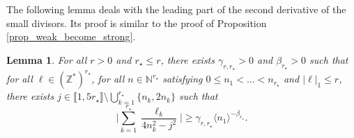 \documentclass[JEP,XML,SOM,Unicode,NoEqCountersInSection,published]{cedram}
\newtheorem{lemma}[theorem]{Lemma}
\theoremstyle{definition}
\begin{document}
The following lemma deals with the leading part of the second derivative of the small divisors. Its proof is similar to the proof of Proposition \ref{prop_weak_become_strong}.
\begin{lemma}\label{lem_SD_frac}
For all $r>0$ and $r_\star \leq r$, there exists $\gamma_{r,r_\star}>0$ and $\beta_{r_\star}>0$ such that for all $\ell \in (\mathbb{Z}^*)^{r_\star}$, for all $n \in \mathbb{N}^{r_\star}$ satisfying $0\leq n_1 < \dots < n_{r_\star}$ and $|\ell|_1 \leq r$, there exists $j\in \llbracket 1,5r_\star \rrbracket \setminus \bigcup_{k=1}^{r_\star}\{ n_k,2n_k\}$ such that
\begin{equation}
\label{eq_SD_rat}
\biggl| \sum_{k=1}^{r_\star} \frac{\ell_k}{4n_k^2-j^2} \biggr| \geq \gamma_{r,r_\star} \langle n_1 \rangle^{-\beta_{r_\star}}.
\end{equation}
\end{lemma}
\end{document}
